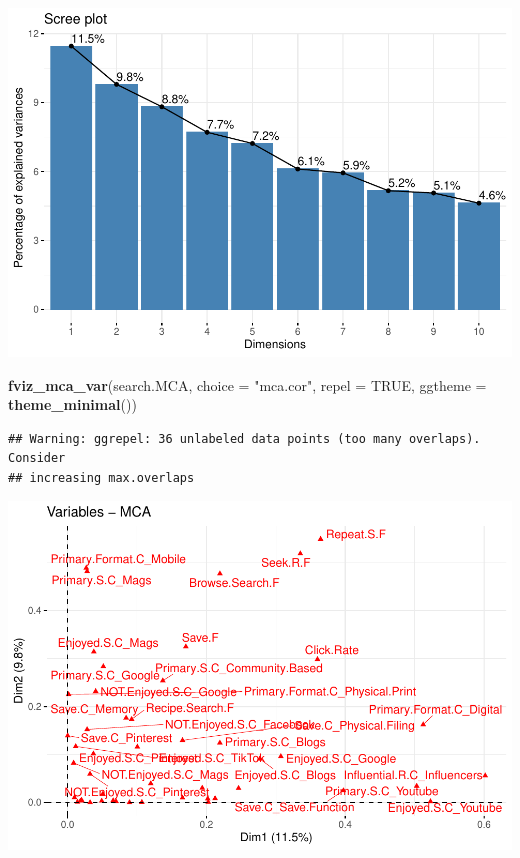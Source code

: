 \documentclass[
]{article}
\newenvironment{Shaded}{\begin{snugshade}}{\end{snugshade}}
\newcommand{\DataTypeTok}[1]{\textcolor[rgb]{0.13,0.29,0.53}{#1}}
\newcommand{\KeywordTok}[1]{\textcolor[rgb]{0.13,0.29,0.53}{\textbf{#1}}}
\newcommand{\NormalTok}[1]{#1}
\newcommand{\OtherTok}[1]{\textcolor[rgb]{0.56,0.35,0.01}{#1}}
\newcommand{\StringTok}[1]{\textcolor[rgb]{0.31,0.60,0.02}{#1}}
\begin{document}
\includegraphics{Average-User-MCA_files/figure-latex/diet no search-1.pdf}

\begin{Shaded}
\begin{Highlighting}[]
\KeywordTok{fviz_mca_var}\NormalTok{(search.MCA, }\DataTypeTok{choice =} \StringTok{"mca.cor"}\NormalTok{, }\DataTypeTok{repel =} \OtherTok{TRUE}\NormalTok{,}
             \DataTypeTok{ggtheme =} \KeywordTok{theme_minimal}\NormalTok{())}
\end{Highlighting}
\end{Shaded}

\begin{verbatim}
## Warning: ggrepel: 36 unlabeled data points (too many overlaps). Consider
## increasing max.overlaps
\end{verbatim}

\includegraphics{Average-User-MCA_files/figure-latex/diet no search-2.pdf}
\end{document}
